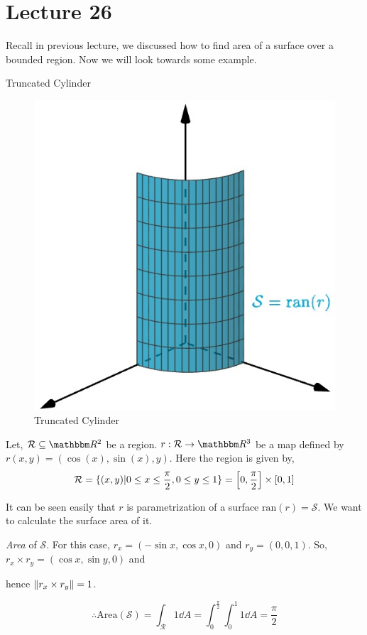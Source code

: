 \documentclass[../Analysis-3]{subfiles}
\begin{document}
\chapter*{Lecture 26} %
\setcounter{chapter}{26} %
\setcounter{section}{0}

Recall in previous lecture, we discussed how to find area of a surface over a bounded region. Now we will look towards some example. 

\begin{Eg}{Truncated Cylinder}{}
    
    \begin{figure}
        \centering
        \includegraphics[width=.78\linewidth]{../figures/lec-26.1.png}
        \caption{Truncated Cylinder}
    \end{figure}

 Let, $\mathcal{R} \subseteq \R^2$ be a region. $r : \mathcal{R} \to \R^3$ be a map defined by $r(x,y) = (\cos(x),\sin(x),y)$. Here the region is given by, 
\[\mathcal{R} = \{(x,y) | 0 \le x \le \frac{\pi}{2} , 0\le y \le 1\} = \qty[0,\frac{\pi}{2}] \times [0,1] \]

It can be seen easily that $r$ is parametrization of a surface $\text{ran}(r) = \mathcal{S}$. We want to calculate the surface area of it.

\textit{Area} of $\mathcal{S}$. For this case, $r_x = (-\sin x, \cos x, 0)$ and $r_y =(0,0,1)$. So, $ r_x \times r_y = (\cos x, \sin y,0)$ and 

\vspace{0.1cm}

hence $\norm{r_x \times r_y} = 1$.

\[\therefore \text{Area}(\mathcal{S}) = \int_{\mathcal{R}} 1 \dd A = \int_0^{\frac{\pi}{2}} \int_{0}^1 1 \dd A = \frac{\pi}{2}\]

\end{Eg}
\end{document}
